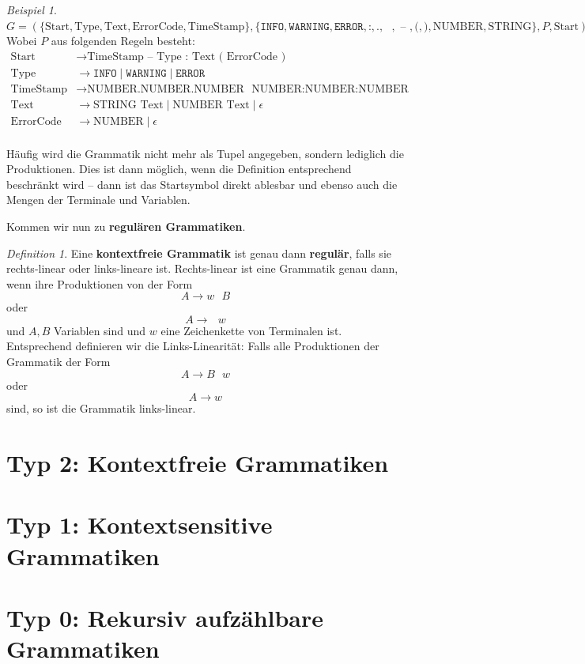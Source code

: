 \documentclass[11pt,a4paper]{scrreport}
\theoremstyle{remark}
\theoremstyle{custom}
\newtheorem{definition}{Definition}[section]
\newtheorem{example}{Beispiel}[section]
\begin{document}
\begin{example}
$
G = (\{\text{Start}, \text{Type}, \text{Text}, \text{ErrorCode}, \text{TimeStamp}\}, \{\texttt{INFO}, \texttt{WARNING}, \texttt{ERROR}, \allowbreak \texttt{:}, \texttt{.}, \texttt{ }, \texttt{ -- }, \texttt{(}, \texttt{)}, \text{NUMBER}, \text{STRING}\}, \allowbreak P, \text{Start}) $ \\
Wobei $P$ aus folgenden Regeln besteht:
\begin{align*}
\text{Start} &\rightarrow \text{TimeStamp} \texttt{ -- } \text{Type} \texttt{ : } \text{Text} \texttt{ ( } \text{ErrorCode} \texttt{ ) } \\
\text{Type} &\rightarrow \texttt{INFO} \mid \texttt{WARNING} \mid \texttt{ERROR} \\
\text{TimeStamp} &\rightarrow \text{NUMBER} \texttt{.} \text{NUMBER} \text{.} \text{NUMBER} \texttt{ } \text{NUMBER} \texttt{:} \text{NUMBER} \texttt{:} \text{NUMBER} \\
\text{Text} &\rightarrow \text{STRING } \text{Text} \mid \text{NUMBER } \text{Text} \mid \epsilon \\
\text{ErrorCode} &\rightarrow \text{NUMBER} \mid \epsilon
\end{align*} \\
Häufig wird die Grammatik nicht mehr als Tupel angegeben, sondern lediglich die Produktionen. Dies ist dann möglich, wenn die Definition entsprechend beschränkt wird -- dann ist das Startsymbol direkt ablesbar und ebenso auch die Mengen der Terminale und Variablen.
\end{example}
Kommen wir nun zu \textbf{regulären Grammatiken}.
\begin{definition}
Eine \textbf{kontextfreie Grammatik} ist genau dann \textbf{regulär}, falls sie rechts-linear oder links-lineare ist. Rechts-linear ist eine Grammatik genau dann, wenn ihre Produktionen von der Form
\[A \rightarrow w\text{ }B\] oder \[A \rightarrow\text{ }w\] und $A, B$ Variablen sind und $w$ eine Zeichenkette von Terminalen ist. Entsprechend definieren wir die Links-Linearität: Falls alle Produktionen der Grammatik der Form
\[A \rightarrow B\text{ }w\] oder \[A \rightarrow w\] sind, so ist die Grammatik links-linear.
\end{definition}
\section{Typ 2: Kontextfreie Grammatiken}
\section{Typ 1: Kontextsensitive Grammatiken}
\section{Typ 0: Rekursiv aufzählbare Grammatiken}
\end{document}
